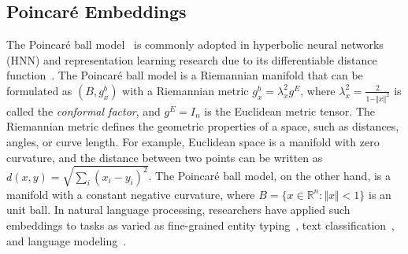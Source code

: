 \subsection{Poincar\'{e} Embeddings}
The Poincar\'{e} ball model~\cite{Cannon_hyperbolicgeometry} is commonly
adopted in hyperbolic neural networks (HNN) and representation learning
research due to its differentiable distance
function~\cite{dhingra-etal-2018-embedding-text-hyper,NIPS2017_poincare_hierarchical}.
The Poincar\'{e} ball model is a Riemannian manifold that can be formulated as
$(B, g_x^b)$ with a Riemannian metric $g_x^b = \lambda_x^2 g^E$, where
$\lambda_x^2 = \frac{2}{1 - \Vert x \Vert^2}$ is called the \textit{conformal
factor}, and $g^E = I_n$ is the Euclidean metric tensor. The Riemannian metric
defines the geometric properties of a space, such as distances, angles, or curve
length. For example, Euclidean space is a manifold with zero curvature, and
the distance between two points can be written as $d(x, y) =
\sqrt{\sum_i{(x_i-y_i)}^2}$. The Poincar\'{e} ball model, on the other hand, is
a manifold with a constant negative curvature, where $B = \{x \in \mathbb{R}^n :
\Vert x \Vert < 1\}$ is an unit ball.
In natural language processing, researchers have applied such embeddings to
tasks as varied as fine-grained entity
typing~\cite{lopez-strube-2020-fully}, text classification~\cite{cho2019large}, and language modeling~\cite{dhingra-etal-2018-embedding-text-hyper}. %
